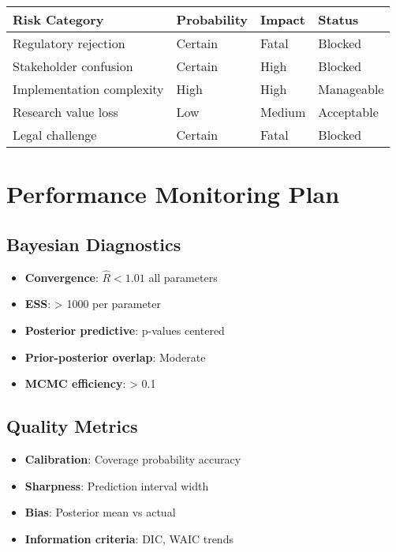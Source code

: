 \begin{center}
\begin{tabular}{llll}
\toprule
Risk Category & Probability & Impact & Status \\
\midrule
Regulatory rejection & Certain & Fatal & Blocked \\
Stakeholder confusion & Certain & High & Blocked \\
Implementation complexity & High & High & Manageable \\
Research value loss & Low & Medium & Acceptable \\
Legal challenge & Certain & Fatal & Blocked \\
\bottomrule
\end{tabular}
\end{center}

\section{Performance Monitoring Plan}

\subsection{Bayesian Diagnostics}

\begin{itemize}
    \item \textbf{Convergence}: $\hat{R} < 1.01$ all parameters
    \item \textbf{ESS}: > 1000 per parameter
    \item \textbf{Posterior predictive}: p-values centered
    \item \textbf{Prior-posterior overlap}: Moderate
    \item \textbf{MCMC efficiency}: > 0.1
\end{itemize}

\subsection{Quality Metrics}

\begin{itemize}
    \item \textbf{Calibration}: Coverage probability accuracy
    \item \textbf{Sharpness}: Prediction interval width
    \item \textbf{Bias}: Posterior mean vs actual
    \item \textbf{Information criteria}: DIC, WAIC trends
\end{itemize}

